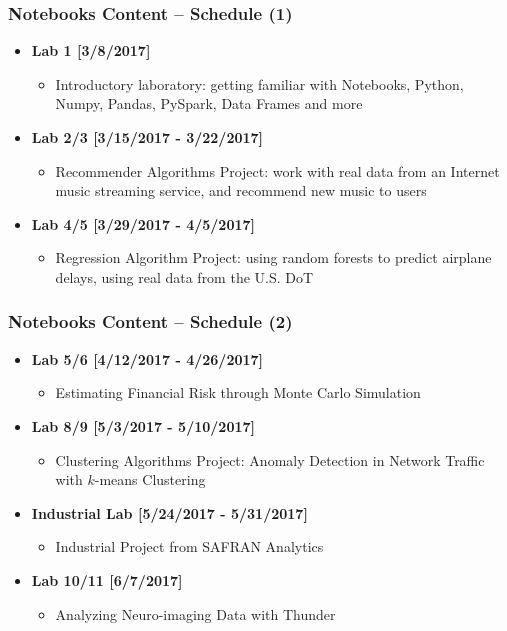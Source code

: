 \begin{frame}\frametitle{Notebooks Content -- Schedule (1)}
\begin{itemize}
	\item {\bf Lab 1 [3/8/2017]}
	\begin{itemize}
		\item Introductory laboratory: getting familiar with Notebooks, Python, Numpy, Pandas, PySpark, Data Frames and more
	\end{itemize}

	\item {\bf Lab 2/3 [3/15/2017 - 3/22/2017]}
	\begin{itemize}
		\item Recommender Algorithms Project: work with real data from an Internet music streaming service, and recommend new music to users
	\end{itemize}

	\item {\bf Lab 4/5 [3/29/2017 - 4/5/2017]}
	\begin{itemize}
		\item Regression Algorithm Project: using random forests to predict airplane delays, using real data from the U.S. DoT
	\end{itemize}
\end{itemize}
\end{frame}

\begin{frame}\frametitle{Notebooks Content -- Schedule (2)}
\begin{itemize}
	\item {\bf Lab 5/6 [4/12/2017 - 4/26/2017]}
	\begin{itemize}
		\item Estimating Financial Risk through Monte Carlo Simulation
	\end{itemize}
	\item {\bf Lab 8/9 [5/3/2017 - 5/10/2017]}
	\begin{itemize}
		\item Clustering Algorithms Project: Anomaly Detection in Network Traffic with $k$-means Clustering
	\end{itemize}
	\item {\bf Industrial Lab [5/24/2017 - 5/31/2017]}
	\begin{itemize}
		\item Industrial Project from SAFRAN Analytics
	\end{itemize}
	\item {\bf Lab 10/11 [6/7/2017]}
	\begin{itemize}
		\item Analyzing Neuro-imaging Data with Thunder
	\end{itemize}
\end{itemize}
\end{frame}


